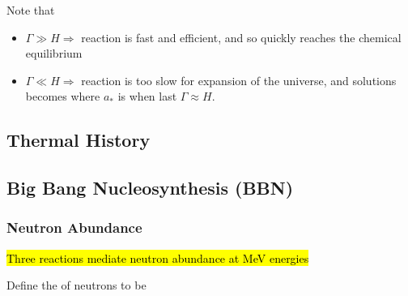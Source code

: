 \documentclass{article}
\begin{document}
Note that
\begin{itemize}
    \item $\Gamma \gg H \Rightarrow$ reaction is fast and efficient, and so quickly reaches the chemical equilibrium 
    \item $\Gamma \ll H \Rightarrow$ reaction is too slow for expansion of the universe, and solutions becomes 
    where $a_\ast$ is when last $\Gamma \approx H$. 
\end{itemize}
\subsection{Thermal History}

\subsection{Big Bang Nucleosynthesis (BBN)}

\subsubsection*{Neutron Abundance}
\hl{Three reactions mediate neutron abundance at MeV energies} 
\begin{definition}
Define the  of neutrons to be 
\end{definition}
\end{document}
